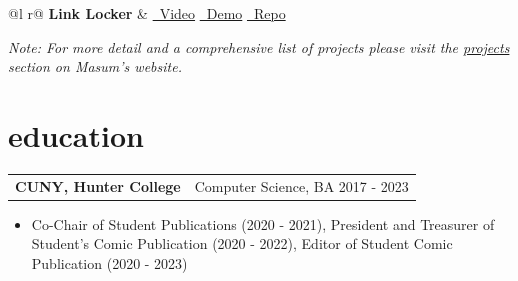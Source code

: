 \documentclass[letterpaper,10pt]{article}
\begin{document}
\begin{tabularx}{\linewidth}{ @{}l r@{} }
    \textbf{Link Locker} & \hfill \href{https://youtu.be/SxkksvAsUzM}{\raisebox{-0.05\height}\faYoutube\ Video} \hspace{5px} \href{https://replit.com/@masum-ahmed/link-locker}{\raisebox{-0.05\height}\faTerminal\ Demo} \hspace{5px} \href{https://github.com/masumahmed/link-locker}{\raisebox{-0.05\height}\faGithub\ Repo} \\[3.75pt]
\end{tabularx}

\emph{Note: For more detail and a comprehensive list of projects please visit the \href{https://masumahmed.net/projects}{{\raisebox{-0.05\height} projects} }section on Masum's website.}
\section{education}
\begin{tabularx}{\linewidth}{@{}l X@{}}	
\textbf{CUNY, Hunter College} & Computer Science, BA \hfill 2017 - 2023 \normalsize \\
\end{tabularx} 
\begin{minipage}[t]{\linewidth}
    \begin{itemize}[nosep,after=\strut, leftmargin=1em, itemsep=0pt]
        \item[--] Co-Chair of Student Publications (2020 - 2021), President and Treasurer of Student's Comic Publication (2020 - 2022), Editor of Student Comic Publication (2020 - 2023)
    \end{itemize}
\end{minipage}

\end{document}

